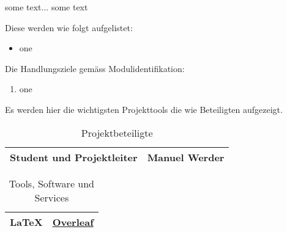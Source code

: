 
\label{einleitung}
\setcounter{page}{1}
\normalsize
some text...
\vSpaceStyle{}
some text

Diese werden wie folgt aufgelistet:

\begin{itemize}
    \item one
\end{itemize}


Die Handlungsziele gemäss Modulidentifikation:

\begin{enumerate}
    \item one
\end{enumerate}


Es werden hier die wichtigsten Projekttools die wie Beteiligten aufgezeigt.

\begin{table}[h!]
    \centering
    \begin{tabularx}{0.8\textwidth} {
    | >{\raggedright\arraybackslash}X
    | >{\raggedright\arraybackslash}X | }
        \hline
        Student und Projektleiter & Manuel Werder \\
        \hline
    \end{tabularx}
    \caption{Projektbeteiligte}
    \label{tab:1}
\end{table}

\begin{table}[h!]
    \centering
    \begin{tabularx}{0.8\textwidth} {
    | >{\raggedright\arraybackslash}X
    | >{\raggedright\arraybackslash}X | }
        \hline
        \LaTeX & \href{https://www.overleaf.com}{Overleaf} \\
        \hline
    \end{tabularx}
    \caption{Tools, Software und Services}
    \label{tab:2}
\end{table}
